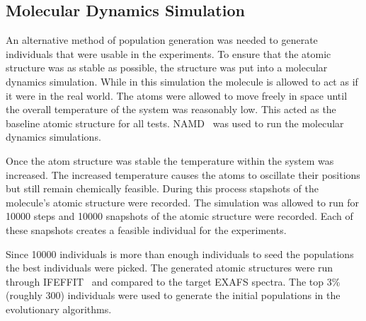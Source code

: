 
\subsection{Molecular Dynamics Simulation}
\label{subsec:molecular-population}

An alternative method of population generation was needed to generate individuals that were usable in the experiments. To ensure that the atomic structure was as stable as possible, the structure was put into a molecular dynamics simulation. While in this simulation the molecule is allowed to act as if it were in the real world. The atoms were allowed to move freely in space until the overall temperature of the system was reasonably low. This acted as the baseline atomic structure for all tests. NAMD~\cite{namd} was used to run the molecular dynamics simulations.

Once the atom structure was stable the temperature within the system was increased. The increased temperature causes the atoms to oscillate their positions but still remain chemically feasible. During this process stapshots of the molecule's atomic structure were recorded. The simulation was allowed to run for 10000 steps and 10000 snapshots of the atomic structure were recorded. Each of these snapshots creates a feasible individual for the experiments.

Since 10000 individuals is more than enough individuals to seed the populations the best individuals were picked. The generated atomic structures were run through IFEFFIT~\cite{ifeffit} and compared to the target EXAFS spectra. The top 3\% (roughly 300) individuals were used to generate the initial populations in the evolutionary algorithms.